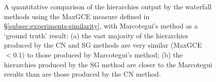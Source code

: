 \documentclass[preprint,a4paper]{elsarticle}
\newenvironment{stusubfig}[1]
{
	\begin{figure}[#1]
	\begin{center}
}
{
	\end{center}
	\end{figure}
}
\begin{document}
\begin{stusubfig}{!t}
	\hspace{4mm}%
\caption{A quantitative comparison of the hierarchies output by the waterfall methods using the MaxGCE measure defined in \S\ref{subsec:experiments-similarity}, with Marcotegui's method as a `ground truth' result: (a) the vast majority of the hierarchies produced by the CN and SG methods are very similar (MaxGCE $< 0.1$) to those produced by Marcotegui's method; (b) the hierarchies produced by the SG method are closer to the Marcotegui results than are those produced by the CN method.}
\label{fig:quantitative-comparison}
\end{stusubfig}
\end{document}
